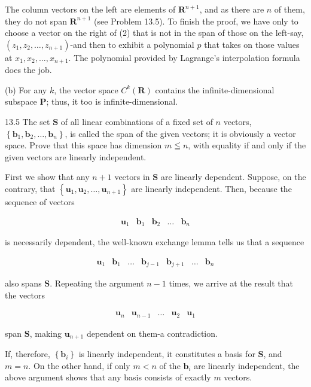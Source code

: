 \documentclass[10pt]{article}
\begin{document}
The column vectors on the left are elements of $\mathbf{R}^{n+1}$, and as there are $n$ of them, they do not span $\mathbf{R}^{n+1}$ (see Problem 13.5). To finish the proof, we have only to choose a vector on the right of (2) that is not in the span of those on the left-say, $\left(z_{1}, z_{2}, \ldots, z_{n+1}\right)$-and then to exhibit a polynomial $p$ that takes on those values at $x_{1}, x_{2}, \ldots, x_{n+1}$. The polynomial provided by Lagrange's interpolation formula does the job.

(b) For any $k$, the vector space $C^{k}(\mathbf{R})$ contains the infinite-dimensional subspace $\mathbf{P}$; thus, it too is infinite-dimensional.

13.5 The set $\mathbf{S}$ of all linear combinations of a fixed set of $n$ vectors, $\left\{\mathbf{b}_{1}, \mathbf{b}_{2}, \ldots, \mathbf{b}_{n}\right\}$, is called the span of the given vectors; it is obviously a vector space. Prove that this space has dimension $m \leqq n$, with equality if and only if the given vectors are linearly independent.

First we show that any $n+1$ vectors in $\mathbf{S}$ are linearly dependent. Suppose, on the contrary, that $\left\{\mathbf{u}_{1}, \mathbf{u}_{2}, \ldots, \mathbf{u}_{n+1}\right\}$ are linearly independent. Then, because the sequence of vectors

$$
\begin{array}{lllll}
\mathbf{u}_{1} & \mathbf{b}_{1} & \mathbf{b}_{2} & \ldots & \mathbf{b}_{n}
\end{array}
$$

is necessarily dependent, the well-known exchange lemma tells us that a sequence

$$
\begin{array}{lllllll}
\mathbf{u}_{1} & \mathbf{b}_{1} & \ldots & \mathbf{b}_{j-1} & \mathbf{b}_{j+1} & \ldots & \mathbf{b}_{n}
\end{array}
$$

also spans $\mathbf{S}$. Repeating the argument $n-1$ times, we arrive at the result that the vectors

$$
\begin{array}{lllll}
\mathbf{u}_{n} & \mathbf{u}_{n-1} & \ldots & \mathbf{u}_{2} & \mathbf{u}_{1}
\end{array}
$$

span $\mathbf{S}$, making $\mathbf{u}_{n+1}$ dependent on them-a contradiction.

If, therefore, $\left\{\mathbf{b}_{i}\right\}$ is linearly independent, it constitutes a basis for $\mathbf{S}$, and $m=n$. On the other hand, if only $m<n$ of the $\mathbf{b}_{i}$ are linearly independent, the above argument shows that any basis consists of exactly $m$ vectors.
\end{document}
